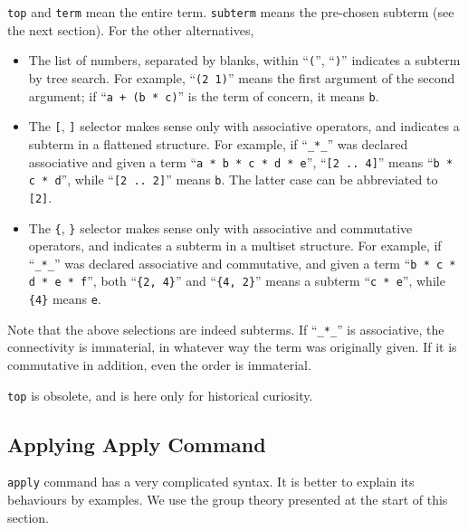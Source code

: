 \documentclass[a4paper]{memoir}
\begin{document}
\verb|top| and \verb|term| mean the entire term.
\verb|subterm| means the pre-chosen subterm (see the next section).
For the other alternatives,
\begin{itemize}
\item
 The list of numbers, separated by blanks, within ``\verb|(|'', ``\verb|)|''
 indicates a subterm by tree search. For example, ``\verb|(2 1)|'' means
 the first argument of the second argument; if ``\verb|a + (b * c)|'' is
 the term of concern, it means \verb|b|.
\item The
 \verb|[|, \verb|]| selector makes sense only with associative operators, and
 indicates a subterm in a flattened structure. For
 example, if ``\verb|_*_|'' was declared associative and given a term \newline
 ``\verb|a * b * c * d * e|'', ``\verb|[2 .. 4]|'' means ``\verb|b * c * d|'',
 while ``\verb|[2 .. 2]|'' means \verb|b|. The latter case can be
 abbreviated to \verb|[2]|.
\item The
 \verb|{|, \verb|}| selector makes sense only with associative and commutative
 operators, and indicates a subterm in a multiset structure.
 For example, if ``\verb|_*_|'' was declared associative and commutative,
 and given a term ``\verb|b * c * d * e * f|'', both ``\verb|{2, 4}|'' and
 ``\verb|{4, 2}|'' means a subterm \newline
 ``\verb|c * e|'', while \verb|{4}| means
 \verb|e|.
\end{itemize}
Note that the above selections are indeed subterms.
If ``\verb|_*_|'' is associative, the connectivity is immaterial, in
whatever way the term was originally given. If it is commutative in
addition, even the order is immaterial.

\begin{warning}
  \verb|top| is obsolete, and is here only for historical curiosity.
\end{warning}

\subsection{Applying Apply Command}\label{sec:p2-usage-of-apply}

\verb|apply| command has a very complicated syntax. It is better to
explain its behaviours by examples.
We use the group theory presented at the start of this section.
\end{document}

